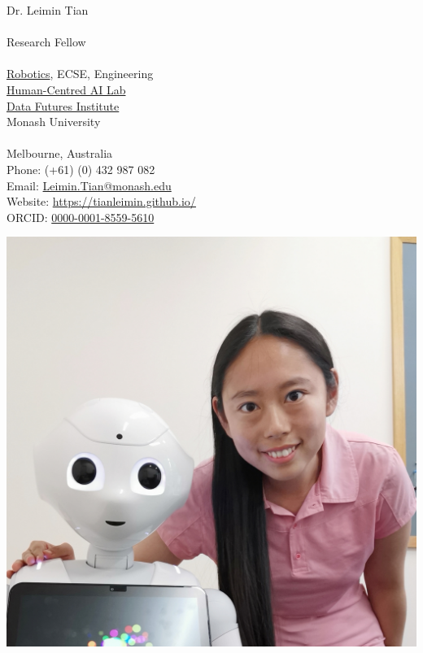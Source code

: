 \documentclass[11pt,letterpaper]{article}
\begin{document}
\begin{minipage}[b]{0.55\textwidth}
  {\huge Dr. Leimin Tian \\}
  \\
  {\large Research Fellow \\}
  \\
  \href{https://www.monash.edu/engineering/robotics}{Robotics}, ECSE, Engineering \\
  \href{https://www.monash.edu/it/hcc/human-centred-ai-lab}{Human-Centred AI Lab} \\
  \href{https://www.monash.edu/data-futures-institute}{Data Futures Institute} \\
  Monash University \\
  \\
  Melbourne, Australia \\
  Phone: (+61) (0) 432 987 082 \\
  Email: \href{mailto:Leimin.Tian@monash.edu}{Leimin.Tian@monash.edu} \\
  Website: \href{https://tianleimin.github.io/}{\ul{https://tianleimin.github.io/}}\\
  ORCID: \href{https://orcid.org/0000-0001-8559-5610}{0000-0001-8559-5610}
\end{minipage}
\hfill
\begin{minipage}[b]{0.4\textwidth}
  \includegraphics[width=\textwidth]{me}
\end{minipage}
\end{document}
